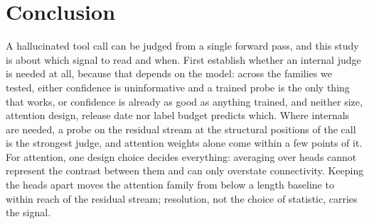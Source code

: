 \section{Conclusion}
\label{sec:conclusion}

A hallucinated tool call can be judged from a single forward pass, and this study is about which signal to
read and when. First establish whether an internal judge is needed at all, because that depends on the model:
across the families we tested, either confidence is uninformative and a trained probe is the only thing that
works, or confidence is already as good as anything trained, and neither size, attention design, release
date nor label budget predicts which. Where internals are needed, a probe on the residual stream at the
structural positions of the call is the strongest judge, and attention weights alone come within a few
points of it. For attention, one design choice decides everything: averaging over heads cannot represent the
contrast between them and can only overstate connectivity. Keeping the heads apart moves the attention
family from below a length baseline to within reach of the residual stream; resolution, not the choice of
statistic, carries the signal.
